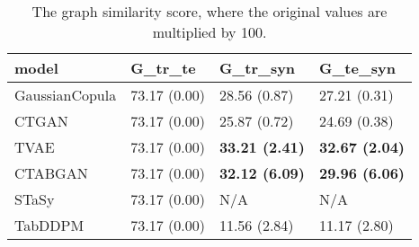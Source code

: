 \begin{table}[h!]
\vspace{-5mm}
\caption{The graph similarity score, where the original values are multiplied by 100.}
\label{tab:graph_metric}
\begin{adjustbox}{width=0.6\textwidth, center} 

\begin{tabular}{|l|l|l|l|}
\hline
model          & G\_tr\_te    & G\_tr\_syn            & G\_te\_syn            \\ \hline
GaussianCopula & 73.17 (0.00) & 28.56 (0.87)          & 27.21 (0.31)          \\ \hline
CTGAN          & 73.17 (0.00) & 25.87 (0.72)          & 24.69 (0.38)          \\ \hline
TVAE           & 73.17 (0.00) & \textbf{33.21 (2.41)} & \textbf{32.67 (2.04)} \\ \hline
CTABGAN        & 73.17 (0.00) & \textbf{32.12 (6.09)} & \textbf{29.96 (6.06)} \\ \hline
STaSy          &   73.17 (0.00)          &    N/A                     &       N/A                  \\ \hline
TabDDPM        & 73.17 (0.00) & 11.56 (2.84)          & 11.17 (2.80)          \\ \hline
\end{tabular}

\end{adjustbox}
\vspace{-5mm}
\end{table}